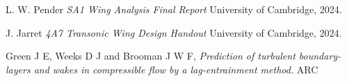 \documentclass[11pt]{article}
\begin{document}
\begin{thebibliography}{9}


      L. W. Pender
      \emph{SA1 Wing Analysis Final Report}
      University of Cambridge,
      2024.
    
      J. Jarret
      \emph{4A7 Transonic Wing Design Handout}
      University of Cambridge,
      2024.

        Green J E, Weeks D J and Brooman J W F,
        \emph{Prediction of turbulent boundary-layers and wakes in compressible flow by a lag-entrainment method.}
        ARC
    
\end{thebibliography}
\end{document}
